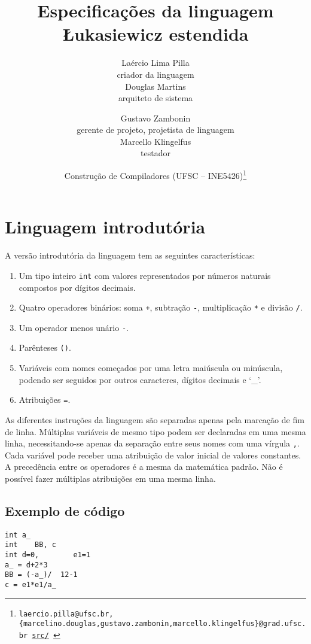 \documentclass{article}
\title{\textbf{Especificações da linguagem Łukasiewicz estendida}}
\author{
    Laércio Lima Pilla \\
    {\small criador da linguagem} \vspace{3mm} \\
    Douglas Martins \\
    {\small arquiteto de sistema} \\
    \and Gustavo Zambonin \\
    {\small gerente de projeto, projetista de linguagem} \vspace{3mm} \\
    Marcello Klingelfus \\
    {\small testador} \\
    \and {\small Construção de Compiladores (UFSC -- INE5426)}\footnote{
        \texttt{laercio.pilla@ufsc.br, 
        \{marcelino.douglas,gustavo.zambonin,marcello.klingelfus\}@grad.ufsc.br
        \hfill \href{https://github.com/zambonin/ufsc-ine5426}{src/}
    }}
}
\date{}
\newenvironment{smallenum}{
    \vspace{-1mm}
    \begin{enumerate}[label=\roman*.]
    \setlength{\parskip}{0pt}
    \setlength{\itemsep}{2pt}
}{
    \vspace{-2mm}
    \end{enumerate}
}
\begin{document}
\maketitle

\tableofcontents

\newpage

\section{Linguagem introdutória}

A versão introdutória da linguagem tem as seguintes características:

\begin{smallenum}

\item Um tipo inteiro \texttt{int} com valores representados por números
    naturais compostos por dígitos decimais.

\item Quatro operadores binários: soma \texttt{+}, subtração \texttt{-},
    multiplicação \texttt{*} e divisão \texttt{/}.

\item Um operador menos unário \texttt{-}.

\item Parênteses \texttt{()}.

\item Variáveis com nomes começados por uma letra maiúscula ou minúscula,
    podendo ser seguidos por outros caracteres, dígitos decimais e ‘\_’.

\item Atribuições \texttt{=}.

\end{smallenum}

As diferentes instruções da linguagem são separadas apenas pela marcação de
fim de linha. Múltiplas variáveis de mesmo tipo podem ser declaradas em uma
mesma linha, necessitando-se apenas da separação entre seus nomes com uma
vírgula \texttt{,}. Cada variável pode receber uma atribuição de valor inicial
de valores constantes. A precedência entre os operadores é a mesma da
matemática padrão. Não é possível fazer múltiplas atribuições em uma mesma
linha.

\subsection{Exemplo de código}

\begin{verbatim}
int a_
int    BB, c
int d=0,        e1=1
a_ = d+2*3
BB = (-a_)/  12-1
c = e1*e1/a_
\end{verbatim} 
\end{document}
